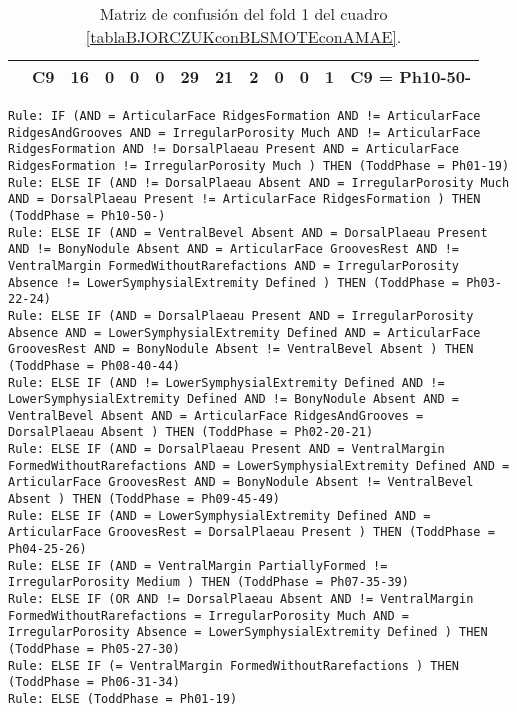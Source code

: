 \begin{table}[H]
{\begin{tabular}{|ccrrrrrrrrrrc|}
\multicolumn{1}{|c|}{}                                      & \multicolumn{1}{c|}{C9} & \multicolumn{1}{c|}{\textbf{16}} & \multicolumn{1}{c|}{0}  & \multicolumn{1}{c|}{0}  & \multicolumn{1}{c|}{0}  & \multicolumn{1}{c|}{\textbf{29}} & \multicolumn{1}{c|}{\textbf{21}} & \multicolumn{1}{c|}{\textbf{2}}  & \multicolumn{1}{c|}{0}  & \multicolumn{1}{c|}{0}  & \multicolumn{1}{c|}{\textbf{1}}  & C9 = Ph10-50-     \\ \hline
\end{tabular}%
}
\caption{Matriz de confusión del fold 1 del cuadro \ref{tablaBJORCZUKconBLSMOTEconAMAE}.}
\end{table}


\begin{lstlisting}
Rule: IF (AND = ArticularFace RidgesFormation AND != ArticularFace RidgesAndGrooves AND = IrregularPorosity Much AND != ArticularFace RidgesFormation AND != DorsalPlaeau Present AND = ArticularFace RidgesFormation != IrregularPorosity Much ) THEN (ToddPhase = Ph01-19)
Rule: ELSE IF (AND != DorsalPlaeau Absent AND = IrregularPorosity Much AND = DorsalPlaeau Present != ArticularFace RidgesFormation ) THEN (ToddPhase = Ph10-50-)
Rule: ELSE IF (AND = VentralBevel Absent AND = DorsalPlaeau Present AND != BonyNodule Absent AND = ArticularFace GroovesRest AND != VentralMargin FormedWithoutRarefactions AND = IrregularPorosity Absence != LowerSymphysialExtremity Defined ) THEN (ToddPhase = Ph03-22-24)
Rule: ELSE IF (AND = DorsalPlaeau Present AND = IrregularPorosity Absence AND = LowerSymphysialExtremity Defined AND = ArticularFace GroovesRest AND = BonyNodule Absent != VentralBevel Absent ) THEN (ToddPhase = Ph08-40-44)
Rule: ELSE IF (AND != LowerSymphysialExtremity Defined AND != LowerSymphysialExtremity Defined AND != BonyNodule Absent AND = VentralBevel Absent AND = ArticularFace RidgesAndGrooves = DorsalPlaeau Absent ) THEN (ToddPhase = Ph02-20-21)
Rule: ELSE IF (AND = DorsalPlaeau Present AND = VentralMargin FormedWithoutRarefactions AND = LowerSymphysialExtremity Defined AND = ArticularFace GroovesRest AND = BonyNodule Absent != VentralBevel Absent ) THEN (ToddPhase = Ph09-45-49)
Rule: ELSE IF (AND = LowerSymphysialExtremity Defined AND = ArticularFace GroovesRest = DorsalPlaeau Present ) THEN (ToddPhase = Ph04-25-26)
Rule: ELSE IF (AND = VentralMargin PartiallyFormed != IrregularPorosity Medium ) THEN (ToddPhase = Ph07-35-39)
Rule: ELSE IF (OR AND != DorsalPlaeau Absent AND != VentralMargin FormedWithoutRarefactions = IrregularPorosity Much AND = IrregularPorosity Absence = LowerSymphysialExtremity Defined ) THEN (ToddPhase = Ph05-27-30)
Rule: ELSE IF (= VentralMargin FormedWithoutRarefactions ) THEN (ToddPhase = Ph06-31-34)
Rule: ELSE (ToddPhase = Ph01-19)
\end{lstlisting}




